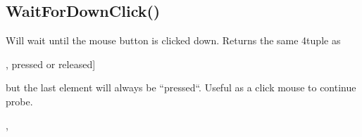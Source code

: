\documentclass[letterpaper,10pt,english]{sphinxmanual}
\begin{document}
\subsection{WaitForDownClick()}
\label{\detokenize{reference/utility:waitfordownclick}}\label{\detokenize{reference/utility:index-44}}
\sphinxAtStartPar
{}

\sphinxAtStartPar
{}

\sphinxAtStartPar
Will wait until the mouse button is clicked down.  Returns   the same 4\sphinxhyphen{}tuple as 

\begin{sphinxVerbatim}[commandchars=\\\{\}]
 [xpos,    ypos,     button id [1\PYGZhy{}3],     \PYGZdq{}\PYGZlt{}pressed\PYGZgt{}\PYGZdq{} or \PYGZdq{}\PYGZlt{}released\PYGZgt{}\PYGZdq{}]

but the last element will always be ``\PYGZlt{}pressed\PYGZgt{}``.  Useful as a \PYGZsq{}click mouse to continue\PYGZsq{} probe.
\end{sphinxVerbatim}

\sphinxAtStartPar
{}

\begin{sphinxVerbatim}[commandchars=\\\{\}]
\end{sphinxVerbatim}

\sphinxAtStartPar
{}

\begin{sphinxVerbatim}[commandchars=\\\{\}]
\PYG{l+s+s2}{\PYGZdq{}Click location: [\PYGZdq{}}
\PYG{l+s+s2}{\PYGZdq{}]\PYGZdq{}}
\end{sphinxVerbatim}

\sphinxAtStartPar
{}

\sphinxAtStartPar
{}, 
\end{document}
